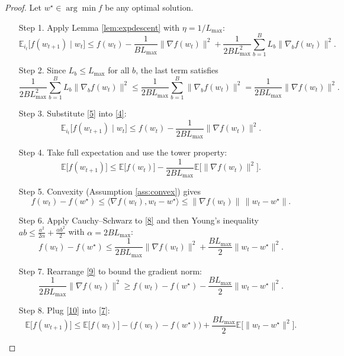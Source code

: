 \documentclass{article}
\newcommand{\E}{\mathbb{E}}
\begin{document}
\begin{proof}
Let $w^{\star}\in\arg\min f$ be any optimal solution.

\begin{enumerate}
\item[Step 1.]  Apply Lemma \ref{lem:expdescent} with $\eta=1/L_{\max}$:
\[
\E_{i_{t}}\!\big[f(w_{t+1})\mid w_{t}\big]
\le f(w_{t})-\frac{1}{B L_{\max}}\|\nabla f(w_{t})\|^{2}
   +\frac{1}{2B L_{\max}^{2}}\sum_{b=1}^{B}L_{b}\|\nabla_{b}f(w_{t})\|^{2}.
\tag{4}
\]

\item[Step 2.]  Since $L_{b}\le L_{\max}$ for all $b$, the last term satisfies
\[
\frac{1}{2B L_{\max}^{2}}\sum_{b=1}^{B}L_{b}\|\nabla_{b}f(w_{t})\|^{2}
\le\frac{1}{2B L_{\max}}\sum_{b=1}^{B}\|\nabla_{b}f(w_{t})\|^{2}
   =\frac{1}{2B L_{\max}}\|\nabla f(w_{t})\|^{2}.
\tag{5}
\]

\item[Step 3.]  Substitute \eqref{5} into \eqref{4}:
\[
\E_{i_{t}}\!\big[f(w_{t+1})\mid w_{t}\big]
\le f(w_{t})-\frac{1}{2B L_{\max}}\|\nabla f(w_{t})\|^{2}.
\tag{6}
\]

\item[Step 4.]  Take full expectation and use the tower property:
\[
\E\!\big[f(w_{t+1})\big]
\le \E\!\big[f(w_{t})\big]
   -\frac{1}{2B L_{\max}}\E\!\big[\|\nabla f(w_{t})\|^{2}\big].
\tag{7}
\]

\item[Step 5.]  Convexity (Assumption \ref{ass:convex}) gives
\[
f(w_{t})-f(w^{\star})\le\langle \nabla f(w_{t}),w_{t}-w^{\star}\rangle
\le \|\nabla f(w_{t})\|\,\|w_{t}-w^{\star}\|.
\tag{8}
\]

\item[Step 6.]  Apply Cauchy–Schwarz to \eqref{8} and then Young’s inequality
$ab\le\frac{a^{2}}{2\alpha}+\frac{\alpha b^{2}}{2}$ with $\alpha=2B L_{\max}$:
\[
f(w_{t})-f(w^{\star})
\le\frac{1}{2B L_{\max}}\|\nabla f(w_{t})\|^{2}
   +\frac{B L_{\max}}{2}\|w_{t}-w^{\star}\|^{2}.
\tag{9}
\]

\item[Step 7.]  Rearrange \eqref{9} to bound the gradient norm:
\[
\frac{1}{2B L_{\max}}\|\nabla f(w_{t})\|^{2}
\ge f(w_{t})-f(w^{\star})-\frac{B L_{\max}}{2}\|w_{t}-w^{\star}\|^{2}.
\tag{10}
\]

\item[Step 8.]  Plug \eqref{10} into \eqref{7}:
\[
\E\!\big[f(w_{t+1})\big]
\le \E\!\big[f(w_{t})\big]
   -\Big(f(w_{t})-f(w^{\star})\Big)
   +\frac{B L_{\max}}{2}\E\!\big[\|w_{t}-w^{\star}\|^{2}\big].
\tag{11}
\]


\end{enumerate}
\end{proof}
\end{document}
